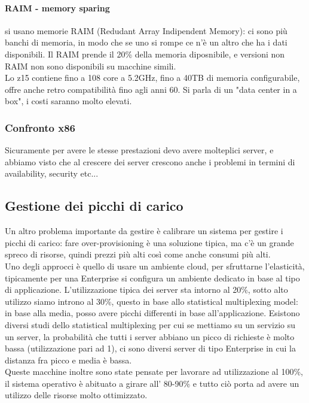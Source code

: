 \documentclass{article}
\begin{document}
\paragraph{RAIM - memory sparing}si usano memorie RAIM (Redudant Array Indipendent Memory): ci sono più banchi di memoria, in modo che se uno si rompe ce n'è un altro che ha i dati disponibili. Il RAIM prende il 20\% della memoria diposnibile, e versioni non RAIM non sono disponibili su macchine simili.\\ Lo z15 contiene fino a 108 core a 5.2GHz, fino a 40TB di memoria configurabile, offre anche retro compatibilità fino agli anni 60. Si parla di un "data center in a box", i costi saranno molto elevati.
\subsubsection{Confronto x86}
Sicuramente per avere le stesse prestazioni devo avere molteplici server, e abbiamo visto che al crescere dei server crescono anche i problemi in termini di availability, security etc...
\subsection{Gestione dei picchi di carico}
Un altro problema importante da gestire è calibrare un sistema per gestire i picchi di carico: fare over-provisioning è una soluzione tipica, ma c'è un grande spreco di risorse, quindi prezzi più alti così come anche consumi più alti.\\ Uno degli approcci è quello di usare un ambiente cloud, per sfruttarne l'elasticità, tipicamente per una Enterprise si configura un ambiente dedicato in base al tipo di applicazione. L'utilizzazione tipica dei server sta intorno al 20\%, sotto alto utilizzo siamo introno al 30\%, questo in base allo statistical multiplexing model: in base alla media, posso avere picchi differenti in base all'applicazione. Esistono diversi studi dello statistical multiplexing per cui se mettiamo su un servizio su un server, la probabilità che tutti i server abbiano un picco di richieste è molto bassa (utilizzazione pari ad 1), ci sono diversi server di tipo Enterprise in cui la distanza fra picco e media è bassa.\\ Queste macchine inoltre sono state pensate per lavorare ad utilizzazione al 100\%, il sistema operativo è abituato a girare all' 80-90\% e tutto ciò porta ad avere un utilizzo delle risorse molto ottimizzato.
\end{document}
